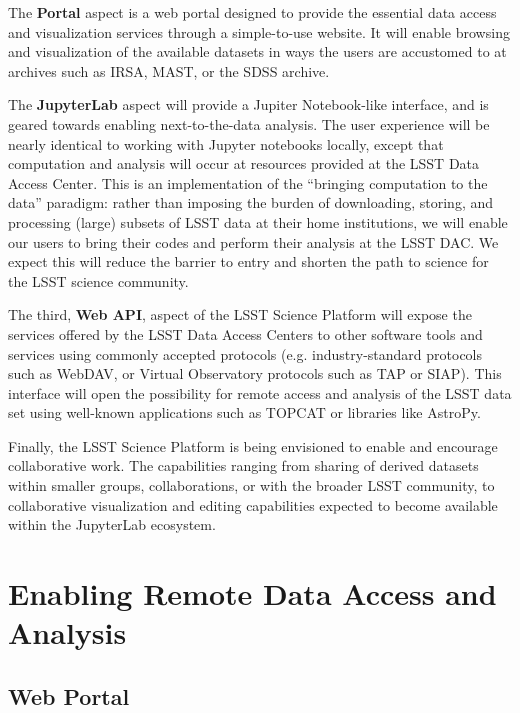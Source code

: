 \documentclass[DM,lsstdraft,toc]{lsstdoc}
\begin{document}
The {\bf Portal} aspect is a web portal designed to provide the essential data
access and visualization services through a simple-to-use website.  It will
enable browsing and visualization of the available datasets in ways the
users are accustomed to at archives such as IRSA, MAST, or the SDSS archive.

The {\bf JupyterLab} aspect will provide a Jupiter Notebook-like interface, and 
is geared towards enabling next-to-the-data analysis. The user experience will 
be nearly identical to working with Jupyter notebooks locally, except that computation
and analysis will occur at resources provided at the LSST Data Access Center.  This is an
implementation of the “bringing computation to the data” paradigm: rather
than imposing the burden of downloading, storing, and processing (large)
subsets of LSST data at their home institutions, we will enable our users to
bring their codes and perform their analysis at the LSST DAC.  We expect
this will reduce the barrier to entry and shorten the path to science for
the LSST science community.

The third, {\bf Web API}, aspect of the LSST Science Platform will expose the
services offered by the LSST Data Access Centers to other software tools and
services using commonly accepted protocols (e.g. industry-standard protocols
such as WebDAV, or Virtual Observatory protocols such as TAP or SIAP). This
interface will open the possibility for remote access and analysis of the LSST 
data set using well-known applications such as TOPCAT or libraries like AstroPy.

Finally, the LSST Science Platform is being envisioned to enable and encourage
collaborative work.  The capabilities ranging from sharing of derived
datasets within smaller groups, collaborations, or with the broader LSST
community, to collaborative visualization and editing capabilities expected
to become available within the JupyterLab ecosystem.

\section{Enabling Remote Data Access and Analysis}

\subsection{Web Portal}
\end{document}
